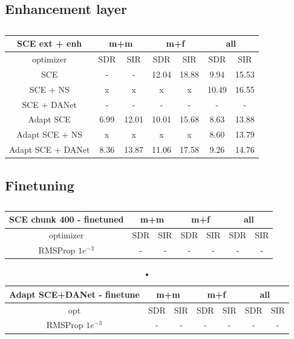 \documentclass[master, tikz, final,11pt, dvipdfmx]{iscs-thesis}
\begin{document}
\subsection{Enhancement layer}
\label{enh}

\begin{table}[h]
\begin{tabular}{c|c|c|c|c|c|c}
SCE ext + enh & \multicolumn{2}{c|}{m+m} & \multicolumn{2}{c|}{m+f} & \multicolumn{2}{c}{all} \\ 
\hline 
optimizer & SDR & SIR & SDR & SIR & SDR & SIR \\ 
\hline
SCE  & - & - & 12.04 & 18.88 & 9.94 & 15.53 \\ 
SCE + NS & x & x & x & x & 10.49 & 16.55 \\ 
SCE + DANet  & - & - & - & - & - & - \\ 
\hline 
\hline 
Adapt SCE  & 6.99 & 12.01 & 10.01 & 15.68 & 8.63 & 13.88 \\ 
Adapt SCE + NS & x & x & x & x & 8.60 & 13.79 \\ 
Adapt SCE + DANet  & 8.36 & 13.87 & 11.06 & 17.58 & 9.26 & 14.76 \\ 

\end{tabular}
\captionsetup{justification=centering}
\caption{}
\label{table:SCE400enh}
\end{table}

\subsection{Finetuning}
\label{finetuning}


\begin{table}[h]
\begin{tabular}{c|c|c|c|c|c|c}
SCE chunk 400 - finetuned & \multicolumn{2}{c|}{m+m} & \multicolumn{2}{c|}{m+f} & \multicolumn{2}{c}{all} \\ 
\hline 
optimizer & SDR & SIR & SDR & SIR & SDR & SIR \\ 
\hline
RMSProp $1e^{-3}$  & - & - & - & - & - & - \\ 
\end{tabular}
\captionsetup{justification=centering}
\caption{}
\label{table:SCEfinetuning}
\end{table}

\begin{table}[h]
\begin{tabular}{c|c|c|c|c|c|c}
Adapt SCE+DANet - finetune & \multicolumn{2}{c|}{m+m} & \multicolumn{2}{c|}{m+f} & \multicolumn{2}{c}{all} \\ 
\hline 
opt & SDR & SIR & SDR & SIR & SDR & SIR \\ 
\hline
RMSProp $1e^{-3}$   & - & - & - & - & - & - \\ 
\end{tabular}

\caption{•}
\end{table}
\end{document}
